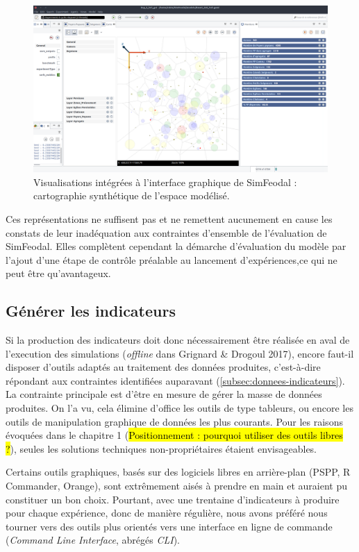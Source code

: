 \begin{figure}[H]
	\captionsetup{width=\linewidth}
	\includegraphics[width=\linewidth]{img/SimFeodal_GUI_carte.png}
	\caption{Visualisations intégrées à l'interface graphique de SimFeodal : cartographie synthétique de l'espace modélisé.} 
	\label{fig:simfeodal_gui_carte} 
\end{figure}
	
	Ces représentations ne suffisent pas et ne remettent aucunement en cause les constats de leur inadéquation aux contraintes d'ensemble de l'évaluation de SimFeodal.
	Elles complètent cependant la démarche d'évaluation du modèle par l'ajout d'une étape de contrôle préalable au lancement d'expériences,ce qui ne peut être qu'avantageux.

	\subsection{Générer les indicateurs}

	Si la production des indicateurs doit donc nécessairement être réalisée en aval de l'execution des simulations (\textit{offline} dans Grignard \& Drogoul 2017), encore faut-il disposer d'outils adaptés au traitement des données produites, c'est-à-dire répondant aux contraintes identifiées auparavant (\autoref{subsec:donnees-indicateurs}).
	La contrainte principale est d'être en mesure de gérer la masse de données produites.
	On l'a vu, cela élimine d'office les outils de type tableurs, ou encore les outils de manipulation graphique de données les plus courants.
	Pour les raisons évoquées dans le chapitre 1 (\hl{Positionnement : pourquoi utiliser des outils libres ?}), seules les solutions techniques non-propriétaires étaient envisageables.

	Certains outils graphiques, basés sur des logiciels libres en arrière-plan (PSPP, R Commander, Orange), sont extrêmement aisés à prendre en main et auraient pu constituer un bon choix.
	Pourtant, avec une trentaine d'indicateurs à produire pour chaque expérience, donc de manière régulière, nous avons préféré nous tourner vers des outils plus orientés vers une interface en ligne de commande (\textit{Command Line Interface}, abrégés \textit{CLI}).
	
